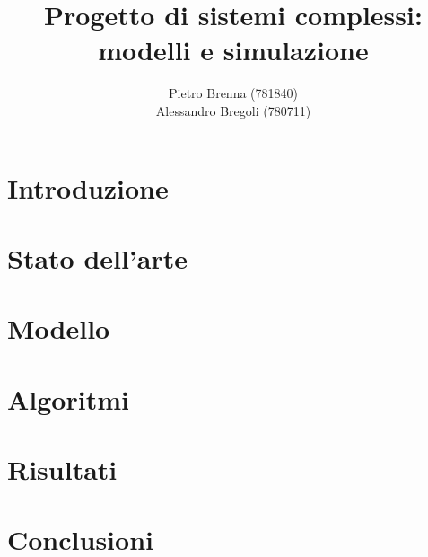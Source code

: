\documentclass[a4paper,11pt]{article}
\title{Progetto di sistemi complessi: modelli e simulazione}
\author{Pietro Brenna (781840) \\ Alessandro Bregoli (780711)}
\date{}
\begin{document}
\maketitle
\newpage
\tableofcontents
\newpage

\section{Introduzione}
  
\newpage
\section{Stato dell'arte}
  
\newpage
\section{Modello}
  
\newpage
\section{Algoritmi}
  
\newpage
\section{Risultati}
  
\newpage
\section{Conclusioni}
    
\newpage
\nocite{*}
 \printbibliography
\end{document}
